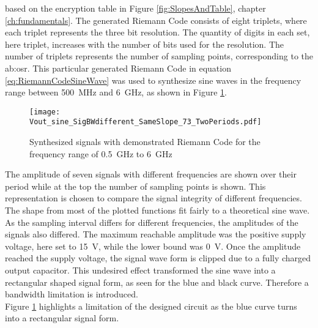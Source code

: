 based on the encryption table in Figure \ref{fig:SlopesAndTable}, chapter \ref{ch:fundamentals}.
The generated Riemann Code consists of eight triplets, where each triplet represents the three bit resolution.
The quantity of digits in each set, here triplet, increases with the number of bits used for the resolution.
The number of triplets represents the number of sampling points, corresponding to the \gls{ab:osr}.
This particular generated Riemann Code in equation \ref{eq:RiemannCodeSineWave} was used to synthesize sine waves in the frequency range between \SI{500}{\MHz} and \SI{6}{\GHz}, as shown in Figure \ref{fig:7SignalsSameSlopeInOnePlot}.

%   

\begin{figure}[htb!] %
   \centering
   \texttt{[image: Vout\_sine\_SigBWdifferent\_SameSlope\_73\_TwoPeriods.pdf]}
   \caption{Synthesized signals with demonstrated Riemann Code for the frequency range of \SI{0.5}{\GHz} to \SI{6}{\GHz}}
   \label{fig:7SignalsSameSlopeInOnePlot}
\end{figure}


The amplitude of seven signals with different frequencies are shown over their period while at the top the number of sampling points is shown.
This representation is chosen to compare the signal integrity of different frequencies.
The shape from most of the plotted functions fit fairly to a theoretical sine wave.
As the sampling interval differs for different frequencies, the amplitudes of the signals also differed.
The maximum reachable amplitude was the positive supply voltage, here set to \SI{15}{\volt}, while the lower bound was \SI{0}{\volt}. 
Once the amplitude reached the supply voltage, the signal wave form is clipped due to a fully charged output capacitor.
This undesired effect transformed the sine wave into a rectangular shaped signal form, as seen for the blue and black curve.
Therefore a bandwidth limitation is introduced.\\
Figure \ref{fig:7SignalsSameSlopeInOnePlot} highlights a limitation of the designed circuit as the blue curve turns into a rectangular signal form.\\

